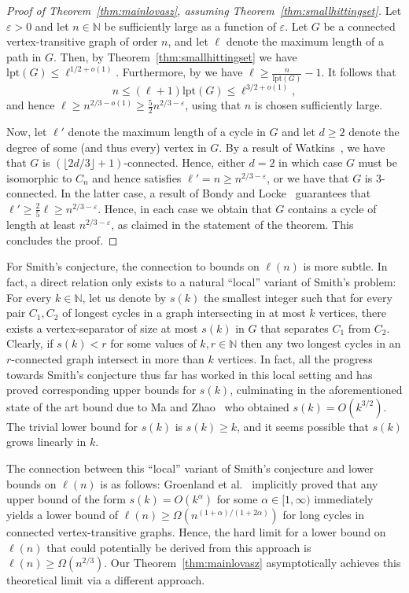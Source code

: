 \documentclass[11pt,reqno]{article}
\begin{document}
\begin{proof}[Proof of Theorem~\ref{thm:mainlovasz}, assuming Theorem~\ref{thm:smallhittingset}]
Let $\varepsilon>0$ and let $n\in \mathbb{N}$ be sufficiently large as a function of $\varepsilon$. Let $G$ be a connected vertex-transitive graph of order $n$, and let $\ell$ denote the maximum length of a path in $G$. Then, by Theorem~\ref{thm:smallhittingset} we have $\mathrm{lpt}(G)\le \ell^{1/2+o(1)}$. Furthermore, by \cite[Proposition~5.1]{groen} we have $\ell\ge \frac{n}{\mathrm{lpt}(G)}-1$. It follows that
$$n\le (\ell+1)\mathrm{lpt}(G)\le \ell^{3/2+o(1)},$$ and hence $\ell\ge n^{2/3-o(1)}\ge \frac{5}{2}n^{2/3-\varepsilon}$, using that $n$ is chosen sufficiently large. 

Now, let $\ell'$ denote the maximum length of a cycle in $G$ and let $d\ge 2$ denote the degree of some (and thus every) vertex in $G$. By a result of Watkins~\cite{watkins}, we have that $G$ is $(\lfloor 2d/3\rfloor+1)$-connected. Hence, either $d=2$ in which case $G$ must be isomorphic to $C_n$ and hence satisfies $\ell'=n\ge n^{2/3-\varepsilon}$, or we have that $G$ is $3$-connected. In the latter case, a result of Bondy and Locke~\cite{bondy} guarantees that $\ell'\ge \frac{2}{5}\ell\ge n^{2/3-\varepsilon}$. Hence, in each case we obtain that $G$ contains a cycle of length at least $n^{2/3-\varepsilon}$, as claimed in the statement of the theorem. This concludes the proof.
\end{proof}

For Smith's conjecture, the connection to bounds on $\ell(n)$ is more subtle. In fact, a direct relation only exists to a natural ``local'' variant of Smith's problem: For every $k\in \mathbb{N}$, let us denote by $s(k)$ the smallest integer such that for every pair $C_1, C_2$ of longest cycles in a graph intersecting in at most $k$ vertices, there exists a vertex-separator of size at most $s(k)$ in $G$ that separates $C_1$ from $C_2$. Clearly, if $s(k)< r$ for some values of $k, r\in \mathbb{N}$ then any two longest cycles in an $r$-connected graph intersect in more than $k$ vertices. In fact, all the progress towards Smith's conjecture thus far has worked in this local setting and has proved corresponding upper bounds for $s(k)$, culminating in the aforementioned state of the art bound due to Ma and Zhao~\cite{ma2025intersections} who obtained $s(k)=O(k^{3/2})$. The trivial lower bound for $s(k)$ is $s(k)\ge k$, and it seems possible that $s(k)$ grows linearly in $k$. 

The connection between this ``local'' variant of Smith's conjecture and lower bounds on $\ell(n)$ is as follows: Groenland et al.~\cite{groen} implicitly proved that any upper bound of the form $s(k)=O(k^\alpha)$ for some $\alpha\in [1,\infty)$ immediately yields a lower bound of $\ell(n)\ge \Omega(n^{(1+\alpha)/(1+2\alpha)})$ for long cycles in connected vertex-transitive graphs. Hence, the hard limit for a lower bound on $\ell(n)$ that could potentially be derived from this approach is $\ell(n)\ge \Omega(n^{2/3})$. Our Theorem~\ref{thm:mainlovasz} asymptotically achieves this theoretical limit via a different approach.
\end{document}
